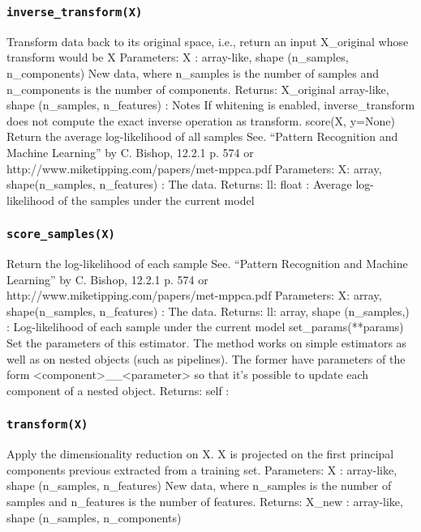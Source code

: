 \subsubsection*{\texttt{inverse_transform(X)}}
Transform data back to its original space, i.e., return an input X_original whose transform would be X
Parameters:	
X : array-like, shape (n_samples, n_components)
New data, where n_samples is the number of samples and n_components is the number of components.
Returns:	
X_original array-like, shape (n_samples, n_features) :
Notes
If whitening is enabled, inverse_transform does not compute the exact inverse operation as transform.
score(X, y=None)
Return the average log-likelihood of all samples
See. “Pattern Recognition and Machine Learning” by C. Bishop, 12.2.1 p. 574 or http://www.miketipping.com/papers/met-mppca.pdf
Parameters:	
X: array, shape(n_samples, n_features) :
The data.
Returns:	
ll: float :
Average log-likelihood of the samples under the current model
\subsubsection*{\texttt{score_samples(X)}}
Return the log-likelihood of each sample
See. “Pattern Recognition and Machine Learning” by C. Bishop, 12.2.1 p. 574 or http://www.miketipping.com/papers/met-mppca.pdf
Parameters:	
X: array, shape(n_samples, n_features) :
The data.
Returns:	
ll: array, shape (n_samples,) :
Log-likelihood of each sample under the current model
set_params(**params)
Set the parameters of this estimator.
The method works on simple estimators as well as on nested objects (such as pipelines). The former have parameters of the form <component>__<parameter> so that it’s possible to update each component of a nested object.
Returns:	self :
\subsubsection*{\texttt{transform(X)}}
Apply the dimensionality reduction on X.
X is projected on the first principal components previous extracted from a training set.
Parameters:	
X : array-like, shape (n_samples, n_features)
New data, where n_samples is the number of samples and n_features is the number of features.
Returns:	
X_new : array-like, shape (n_samples, n_components)

\newpage

